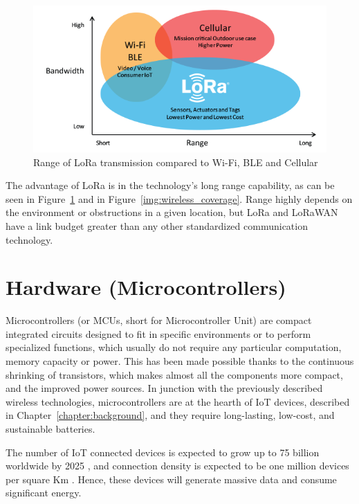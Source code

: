 			\begin{figure}[h]
				\centering
				\includegraphics[width=\textwidth]{resources/img/chap3/LoRa_Why_Range}
				\caption{Range of LoRa transmission compared to Wi-Fi, BLE and Cellular}
				\label{img:lora_range}
			\end{figure}
			
			The advantage of LoRa is in the technology's long range capability, as can be seen in Figure~\ref{img:lora_range} and in Figure~\ref{img:wireless_coverage}.
			Range highly depends on the environment or obstructions in a given location, but LoRa and LoRaWAN have a link budget greater than any other standardized communication technology.
					
	\section{Hardware (Microcontrollers)}\label{sec:microcontrollers}
	
	
		Microcontrollers (or MCUs, short for Microcontroller Unit) are compact integrated circuits designed to fit in specific environments or to perform specialized functions, which usually do not require any particular computation, memory capacity or power.
		This has been made possible thanks to the continuous shrinking of transistors, which makes almost all the components more compact, and the improved power sources.
		In junction with the previously described wireless technologies, microcontrollers are at the hearth of IoT devices, described in Chapter~\ref{chapter:background}, and they require long-lasting, low-cost, and sustainable batteries.
		
		The number of IoT connected devices is expected to grow up to 75 billion worldwide by 2025 \cite{statista}, and connection density is expected to be one million devices per square Km \cite{noma}.
		Hence, these devices will generate massive data and consume significant energy.
		
